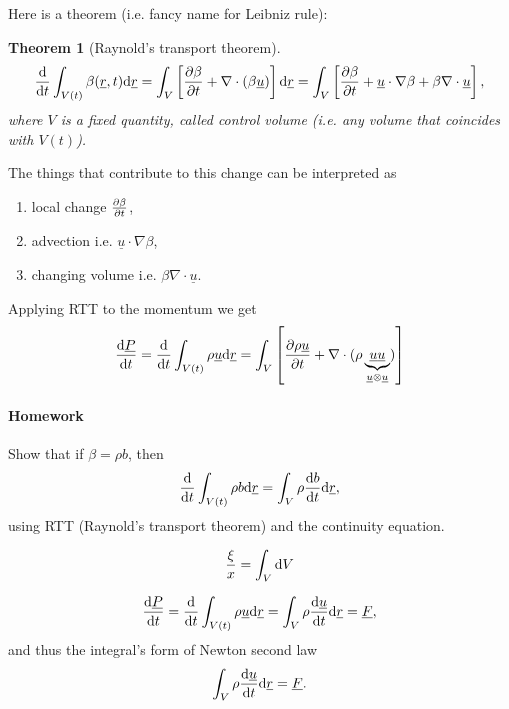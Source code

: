 \documentclass[11pt,oneside]{book}
\renewcommand{\vec}[1]{\underline{#1}}
\theoremstyle{definition} %
\theoremstyle{plain} %
\newtheorem{theorem}{Theorem}[section]
\theoremstyle{remark} %
\theoremstyle{underline}
\begin{document}
  Here is a theorem (i.e. fancy name for Leibniz rule):
  
  \begin{theorem}[Raynold's transport theorem]
    \begin{displaymath}
      \dfrac{}{t} \int_{V(t)} \beta (\vec r, t) \d \vec r = 
      \int_{V}\left[ \ptf{\beta}{t} + \nabla \cdot (\beta \vec u) \right] \d \vec r
      = \int_V \left[ \ptf{\beta}{t} + \vec u \cdot \nabla \beta + \beta \nabla \cdot \vec u \right]
      ,
    \end{displaymath}
    where $V$ is a fixed quantity, called control volume (i.e. any volume that coincides with $V(t)$).
  \end{theorem}

  The things that contribute to this change can be interpreted as
  \begin{enumerate}
    \item local change $\frac{\partial \beta}{\partial t}$,
    \item advection i.e. $\vec u \cdot \nabla \beta$,
    \item changing volume i.e. $\beta \nabla\cdot \vec u$.
  \end{enumerate}

  Applying RTT to the momentum we get
  \begin{displaymath}
    \dfrac{\vec P }{t} = \dfrac{}{t} \int_{V(t)} \rho \vec u \d \vec r 
    = \int_V \left[ \ptf{\rho\vec u }{t} + \nabla \cdot (\rho \underbrace{\vec u \vec u}_{\vec u \otimes \vec u}) \right]
  \end{displaymath}
  
  \paragraph{Homework} Show that if $\beta = \rho b$, then 
  \begin{displaymath}
    \dfrac{}{t} \int_{V(t)} \rho b \d \vec r = \int_{V} \rho \dfrac{b}{t} \d \vec r,
  \end{displaymath}
  using RTT (Raynold's transport theorem) and the continuity equation.
  
  \begin{displaymath}
    \frac{\xi }{ x} = \int_V \mathrm{d} V 
  \end{displaymath}
  
  \begin{displaymath}
    \dfrac{\vec P}{t} = \dfrac{}{t} \int_{V(t)} \rho \vec u \d \vec r 
    = \int_V \rho \dfrac{\vec u}{t} \d \vec r 
    = \vec F,
  \end{displaymath}
  and thus the integral's form of Newton second law
  \begin{displaymath}
    \int_V \rho \dfrac{\vec u}{t} \d \vec r = \vec F.
  \end{displaymath}
  
\end{document}
